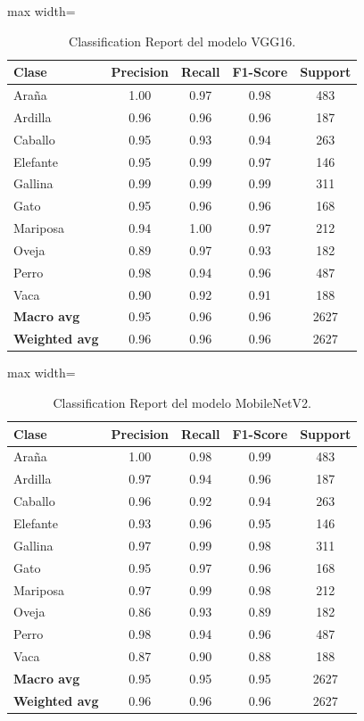 \documentclass[1p,12pt]{elsarticle}
\begin{document}
\begin{table}[h]
\centering
\begin{adjustbox}{max width=\textwidth}
\begin{tabular}{lcccc}
\hline
\textbf{Clase} & \textbf{Precision} & \textbf{Recall} & \textbf{F1-Score} &
\textbf{Support} \\
\hline
Araña       & 1.00 & 0.97 & 0.98 & 483 \\
Ardilla     & 0.96 & 0.96 & 0.96 & 187 \\
Caballo     & 0.95 & 0.93 & 0.94 & 263 \\
Elefante    & 0.95 & 0.99 & 0.97 & 146 \\
Gallina     & 0.99 & 0.99 & 0.99 & 311 \\
Gato        & 0.95 & 0.96 & 0.96 & 168 \\
Mariposa    & 0.94 & 1.00 & 0.97 & 212 \\
Oveja       & 0.89 & 0.97 & 0.93 & 182 \\
Perro       & 0.98 & 0.94 & 0.96 & 487 \\
Vaca        & 0.90 & 0.92 & 0.91 & 188 \\
\hline
\textbf{Macro avg}    & 0.95 & 0.96 & 0.96 & 2627 \\
\textbf{Weighted avg} & 0.96 & 0.96 & 0.96 & 2627 \\
\hline
\end{tabular}
\end{adjustbox}
\caption{Classification Report del modelo VGG16.}
\label{tab:report_vgg16}
\end{table}

\begin{table}[h]
\centering
\begin{adjustbox}{max width=\textwidth}
\begin{tabular}{lcccc}
\hline
\textbf{Clase} & \textbf{Precision} & \textbf{Recall} & \textbf{F1-Score} &
\textbf{Support} \\
\hline
Araña       & 1.00 & 0.98 & 0.99 & 483 \\
Ardilla     & 0.97 & 0.94 & 0.96 & 187 \\
Caballo     & 0.96 & 0.92 & 0.94 & 263 \\
Elefante    & 0.93 & 0.96 & 0.95 & 146 \\
Gallina     & 0.97 & 0.99 & 0.98 & 311 \\
Gato        & 0.95 & 0.97 & 0.96 & 168 \\
Mariposa    & 0.97 & 0.99 & 0.98 & 212 \\
Oveja       & 0.86 & 0.93 & 0.89 & 182 \\
Perro       & 0.98 & 0.94 & 0.96 & 487 \\
Vaca        & 0.87 & 0.90 & 0.88 & 188 \\
\hline
\textbf{Macro avg}    & 0.95 & 0.95 & 0.95 & 2627 \\
\textbf{Weighted avg} & 0.96 & 0.96 & 0.96 & 2627 \\
\hline
\end{tabular}
\end{adjustbox}
\caption{Classification Report del modelo MobileNetV2.}
\label{tab:report_mobilenetv2}
\end{table}
\end{document}
